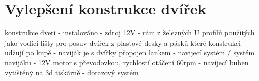 \section{Vylepšení konstrukce dvířek}\label{sec:vylepseni-konstrukce-dvirek}
konstrukce dveri - instalováno
- zdroj 12V
- rám z železných U profilů použitých jako vodící lišty pro posuv dvířek z plastové desky a pásků které konstrukci udžují po kupě
- naviják je s dvířky přopojen lankem
- navijecí systém / systém navijáku
- 12V motor s převodovkou, rychlostí otáčení 60rpm
- navíjecí buben vytištěný na 3d tiskárně
- dorazový systém